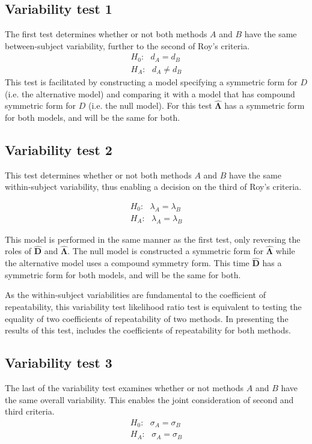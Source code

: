 \subsection{Variability test 1}
The first test determines whether or not both methods $A$ and $B$ have the same between-subject variability, further to the second of Roy's criteria.
\begin{eqnarray*}
H_{0}: \mbox{ }d_{A}  = d_{B} \\
H_{A}: \mbox{ }d_{A}  \neq d_{B}
\end{eqnarray*}
This test is facilitated by constructing a model specifying a symmetric form for $D$ (i.e. the alternative model) and comparing it with a model that has compound symmetric form for $D$ (i.e. the null model). For this test $\boldsymbol{\hat{\Lambda}}$ has a symmetric form for both models, and will be the same for both.

\subsection{Variability test 2}

This test determines whether or not both methods $A$ and $B$ have the same within-subject variability, thus enabling a decision on the third of Roy's criteria.

\begin{eqnarray*}
H_{0}: \mbox{ }\lambda_{A}  = \lambda_{B} \\
H_{A}: \mbox{ }\lambda_{A}  = \lambda_{B}
\end{eqnarray*}

This model is performed in the same manner as the first test, only reversing the roles of $\boldsymbol{\hat{D}}$ and $\boldsymbol{\hat{\Lambda}}$. The null model is constructed a symmetric form for $\boldsymbol{\hat{\Lambda}}$ while the alternative model uses a compound symmetry form. This time $\boldsymbol{\hat{D}}$ has a symmetric form for both models, and will be the same for both.

As the within-subject variabilities are fundamental to the coefficient of repeatability, this variability test likelihood ratio test is equivalent to testing the equality of two coefficients of repeatability of two methods. In presenting the results of this test, \citet{roy} includes the coefficients of repeatability for both methods.

\subsection{Variability test 3}
The last of the variability test examines whether or not methods $A$ and $B$ have the same overall variability. This enables the joint consideration of second and third criteria.
\begin{eqnarray*}
H_{0}: \mbox{ }\sigma_{A}  = \sigma_{B} \\
H_{A}: \mbox{ }\sigma_{A}  = \sigma_{B}
\end{eqnarray*}

